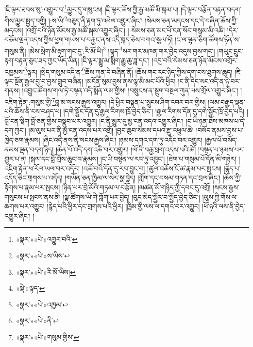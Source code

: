 །ཇི་ལྟར་ཐབས་སུ་:འགྱུར་བ་\footnote{«སྣར་»«པེ་»འགྱུར་བའི་}མྱུར་དུ་གསུངས། །ཇི་ལྟར་ཆོས་ཀྱི་རྒྱ་མཚོ་མི་སྐམ་པ། །དེ་ལྟར་བརྩོན་བརྟན་བདག་གིས་མྱུར་སྤྱད་བགྱི། །:ས་ཡི་\footnote{«སྣར་»«པེ་»ས་ཡིས་}བཅུད་ནི་རྟག་ཏུ་འཕེལ་འགྱུར་ཞིང་། །སེམས་ཅན་མདངས་དང་དེ་བཞིན་ཆོས་ཀྱི་མདངས། །འགྲོ་བའི་ཉོན་མོངས་རྒྱ་མཚོ་སྐམ་འགྱུར་ཞིང་། །
སེམས་ཅན་མང་པོ་ངན་སོང་གསུམ་མི་འཆི། །དེར་བཅོམ་ལྡན་འདས་ཀྱིས་ཕྱག་གཡས་པ་བརྐྱང་ནས་འདི་སྐད་ཅེས་བཀའ་སྩལ་ཏོ། །ང་ལ་ལྷན་ཅིག་ཚོགས་ཉོན་ས་གསུམ་ནི། །མེས་སྲེག་མི་རྟག་གང་དུ་:རི་མོ་ཡི།\footnote{«སྣར་»«པེ་»རི་མོ་ཡིས།} །ལྷད་\footnote{«སྡེ་»ལྟད་}སར་གར་མཁན་གར་བྱེད་འདུས་བྱས་གང་། །གཡུང་དྲུང་རྟག་བརྟན་ཅུང་ཟད་ཀྱང་ཡོད་མིན། །ཇི་ལྟར་སྒྱུ་མ་སྨིག་རྒྱུ་ཆུ་ཟླ་དང་། །འདྲ་བའི་སེམས་ཅན་ཉོན་མོངས་འགྲོར་འཁྱམས་\footnote{«སྣར་»«པེ་»འཁྱམ་}ལྟར། །སྲིད་གསུམ་འདི་ན་\footnote{«སྣར་»«པེ་»ནི་}ཆོས་ཀུན་དེ་བཞིན་ནོ། །ཆོས་གང་རང་ཉིད་ཀྱིས་དག་ངས་ཐུགས་ཆུད། །ཇི་ལྟར་སྔོན་རྒྱལ་བྱ་བ་བྱས་གྲུབ་བཞིན། །མངོན་སུམ་བྱས་ནས་ལྷ་མི་མང་པོའི་ཕྱིར། །ང་ནི་དེང་སང་འདི་ན་ཉེ་བར་གནས། །འབྱུང་ཚོགས་གལ་ཏེ་བསྟན་འདི་སྨོན་ལམ་གྱིས། །བསྲུངས་ན་སྡུག་བསྔལ་ཀུན་ལས་གྲོལ་འགྱུར་ཞིང་། །འཇིག་རྟེན་:གསུམ་གྱི་\footnote{«སྣར་»«པེ་»གསུམ་གྱིས་}བླ་མ་སངས་རྒྱས་འགྱུར། །དེ་ཕྱིར་བསྟན་པ་སྲུངས་ཤིག་འབར་བར་གྱིས། །ལམ་བརྒྱད་ལྡན་པའི་ཆོས་ནི་ངས་བཤད་པ། །དགེ་སྦྱོང་དོན་དུ་རྒྱལ་རིགས་ཁྲོ་བྱེད་ཅིང་། །རྒྱལ་རིགས་དོན་དུ་དགེ་སྦྱོང་ཁྲོ་བྱེད་པའི། །བློ་ངན་སྡིག་བློ་ཅན་གྱིས་བསྣུབ་པར་འགྱུར། །ང་ནི་མྱུར་དུ་མྱ་ངན་འདའ་འགྱུར་ཞིང་། །ང་ཡི་ཉན་ཐོས་མཁས་པ་དེ་དག་ཀྱང་། །མ་ལུས་པར་ནི་མྱ་ངན་འདས་པར་འགྲོ། །བྱང་ཆུབ་སེམས་དཔའ་རྫུ་འཕྲུལ་ཆེ། །བསོད་ནམས་བྱས་པ་ཁྱེད་ཅག་རྣམས། །ཞིང་འདི་ནས་ནི་སངས་རྒྱས་ཞིང་། །ཉམས་དགའ་དག་ཏུ་འདོང་བར་འགྱུར། །རྒྱལ་པོ་བསོད་ནམས་ལྡན་བདག་ཉིད། །ཆེན་པོ་འདི་དག་འཆི་བར་འགྱུར། །ལོ་ནི་བརྒྱ་ཕྲག་འདས་པའི་ཚེ། །བསྟན་པ་ཉམས་པར་གྱུར་པ་ན། །སྐལ་དང་བློ་གྲོས་ཆུང་བ་རྣམས། །ང་ཡི་བསྟན་ལ་རབ་ཏུ་འབྱུང་། །ཐེག་པ་གསུམ་པོ་དོན་མི་གཉེར། །འཇིག་རྟེན་ཕ་རོལ་ཡལ་བར་འདོར། །འཚོ་བའི་དོན་དུ་རབ་བྱུང་བ། །ཚུལ་འཆོས་ངོ་ཚ་རྣམ་པར་སྤངས། །རྙེད་པ་འདོད་ཅིང་གྲགས་པ་འདོད། །གཡོན་ཅན་ཁྱིམ་ལ་སེར་སྣ་བྱེད། །ཀློག་དང་བསམ་གཏན་དང་བྲལ་ཞིང་། །ཆོས་ཀྱི་རྟོགས་པ་རྣམ་པར་སྤངས། །ཉིན་པར་བྲེ་མོའི་གཏམ་ལ་བརྩོན། །མཚན་མོ་གཉིད་ཀྱི་དབང་དུ་འགྲོ། །སངས་རྒྱས་གསུངས་པ་སྤངས་ནས་ནི། །སྣ་ཚོགས་ཡི་གེ་ཀློག་པར་བྱེད། །བུད་མེད་སྦྱོར་བ་སྤྱོད་བྱེད་ཅིང་། །ལུས་ཀྱི་གོས་ལ་ཆགས་པར་འགྱུར། །རྙེད་པའི་ཕྱིར་དང་གྲགས་པའི་ཕྱིར། །ཁྱིམ་གྱི་ལས་ལ་དགའ་བར་འགྱུར། །ཕོ་ཉའི་ལས་ནི་བྱེད་འགྱུར་ཞིང་། །

